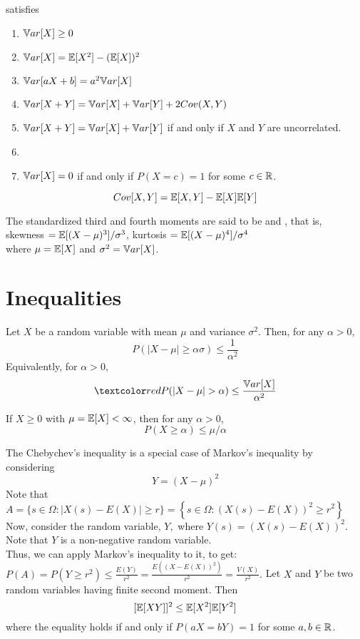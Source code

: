 \documentclass[11pt]{article}
\begin{document}
satisfies
\begin{enumerate}
	\item $\mathbb{V}ar[{X}] \geq 0$
	\item $\mathbb{V}ar[{X}] = \mathbb{E}[{X^2}] - (\mathbb{E}[{X}])^2$
	\item $\mathbb{V}ar[{aX + b}] = a^2 \mathbb{V}ar[{X}]$
	\item $\mathbb{V}ar[{X + Y}] = \mathbb{V}ar[{X}] + \mathbb{V}ar[{Y}] + 2Cov(X, Y)$
	\item $\mathbb{V}ar[{X + Y}] = \mathbb{V}ar[{X}] + \mathbb{V}ar[{Y}]$ if and only if $X$ and $Y$ are uncorrelated.
	\item {}
	\item $\mathbb{V}ar[{X}] = 0$ if and only if $P(X = c) = 1$ for some $c \in \mathbb{R}$.
\end{enumerate}
$$Cov[X, Y] = \mathbb{E}[{X, Y}] - \mathbb{E}[{X}]\mathbb{E}[{Y}]$$


The standardized third and fourth moments are said to be  and , that is, \\
skewness $= \mathbb{E}[{(X - \mu)^3}] / \sigma^3$, \quad kurtosis $= \mathbb{E}[{(X - \mu)^4}] / \sigma^4$ \\
where $\mu = \mathbb{E}[{X}]$ and $\sigma^2 = \mathbb{V}ar[{X}]$.


\section{Inequalities}
Let $X$ be a random variable with mean $\mu$ and variance $\sigma^2$. Then, for any $\alpha > 0$,
$$P(|X - \mu| \geq \alpha\sigma) \leq \frac{1}{\alpha^2}$$
Equivalently, for $\alpha > 0$,
$$\red{P(|X - \mu| > \alpha) \leq \frac{\var{X}}{\alpha^2}}$$

If $X \geq 0$ with $\mu = \mathbb{E}[{X}] < \infty$, then for any $\alpha > 0$, 
$$P(X \geq \alpha) \leq \mu / \alpha$$

\remark
The Chebychev's inequality is a special case of Markov's inequality by considering $$Y = (X - \mu)^2$$
Note that
\(A=\{s \in \Omega:| X(s)-E(X) | \geq r\}=\left\{s \in \Omega :(X(s)-E(X))^{2} \geq r^{2}\right\}\) \\
Now, consider the random variable, \(Y,\) where
\(Y(s)=(X(s)-E(X))^{2} .\) \\
Note that \(Y\) is a non-negative random variable. \\
Thus, we can apply Markov's inequality to it, to get: \\
\(P(A)=P\left(Y \geq r^{2}\right) \leq \frac{E(Y)}{r^{2}}=\frac{E\left((X-E(X))^{2}\right)}{r^{2}}=\frac{V(X)}{r^{2}} . \)
Let $X$ and $Y$ be two random variables having finite second moment. Then
$$[\mathbb{E}[{XY}]]^2 \leq \mathbb{E}[{X^2}]\mathbb{E}[{Y^2}]$$
where the equality holds if and only if $P(aX = bY) = 1$ for some $a, b \in \mathbb{R}$.
\end{document}
